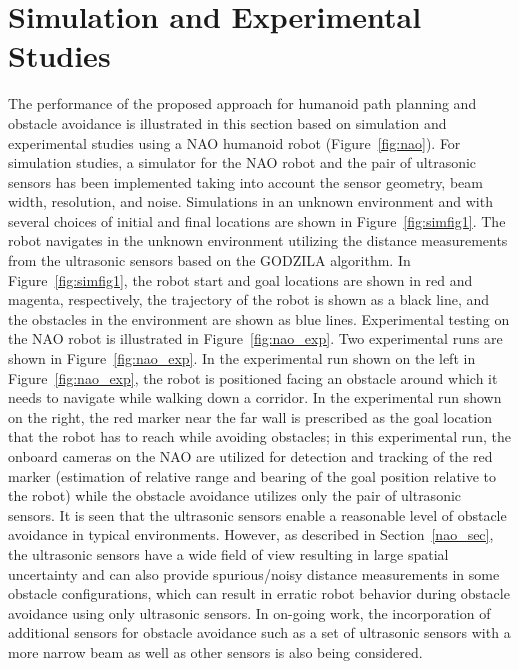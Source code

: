 \documentclass[10pt,conference]{ieeeconf}
\begin{document}
    \vspace*{-0.03in}
\section{Simulation and Experimental Studies}
\label{sim_exp_sec}
    \vspace*{-0.03in}
The performance of the proposed approach for humanoid path planning and
obstacle avoidance is illustrated in this section based on simulation and
experimental studies using a NAO humanoid robot (Figure~\ref{fig:nao}).
For simulation studies, a simulator for the NAO robot and the pair of
ultrasonic sensors has been implemented taking into account the sensor
geometry, beam width, resolution, and noise. Simulations in an unknown
environment and with several choices of initial and final locations are shown
in Figure~\ref{fig:simfig1}.  The robot navigates in the unknown environment
utilizing the distance measurements from the ultrasonic sensors based on the
GODZILA algorithm. In Figure~\ref{fig:simfig1}, the robot start and goal
  locations are shown in red and magenta, respectively, the trajectory of the
robot is shown as a black line, and the obstacles in the environment are shown as
blue lines. Experimental testing on the NAO robot is illustrated in
Figure~\ref{fig:nao_exp}. Two experimental runs are shown in Figure~\ref{fig:nao_exp}. 
In the experimental run shown on the left in Figure~\ref{fig:nao_exp}, the robot is positioned facing an obstacle around which it needs to
    navigate while walking down a corridor. In the experimental run shown on the right, the red marker near the far wall is prescribed as the goal location that the robot has to reach while avoiding obstacles; in this experimental run, the onboard cameras on the NAO are utilized for detection and tracking of the red marker (estimation of relative range and bearing of the goal position relative to the robot) while the obstacle avoidance utilizes only the pair of ultrasonic sensors.
It is seen that the ultrasonic sensors enable a reasonable level of obstacle avoidance in typical environments. However, as described in Section~\ref{nao_sec}, the ultrasonic sensors have a wide field of view resulting in large spatial uncertainty and can also provide spurious/noisy distance measurements in some obstacle configurations, which can result in erratic robot behavior during obstacle avoidance using only ultrasonic sensors. In on-going work, the incorporation of additional sensors for obstacle avoidance such as a set of ultrasonic
sensors with a more narrow beam as well as other sensors is also being considered.
\end{document}
